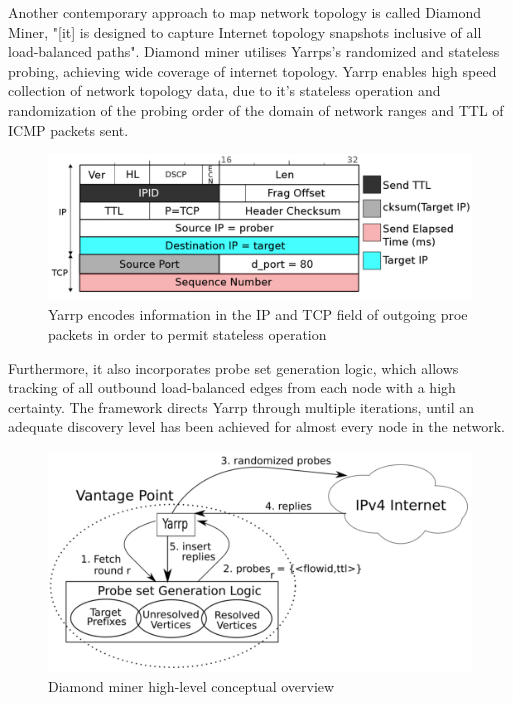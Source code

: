 Another contemporary approach to map network topology is called Diamond Miner, "[it] is designed to capture Internet topology snapshots inclusive of all load-balanced paths". \cite{diamond-miner} Diamond miner utilises Yarrps's randomized and stateless probing, achieving wide coverage of internet topology. Yarrp enables high speed collection of network topology data, due to it's stateless operation and randomization of the probing order of the domain of network ranges and TTL of ICMP packets sent. \cite{yarrp}

\begin{figure}[!ht]
  \begin{center}
    \includegraphics[scale=0.3]{images/yarrp.png}
    \caption{Yarrp encodes information in the IP and TCP field of outgoing proe packets in order to permit stateless operation \cite{yarrp}}
    \label{figure:yarrp_fig}
  \end{center}
\end{figure}

Furthermore, it also incorporates probe set generation logic, which allows tracking of all outbound load-balanced edges from each node with a high certainty. The framework directs Yarrp through multiple iterations, until an adequate discovery level has been achieved for almost every node in the network. \cite{diamond-miner}

\begin{figure}[!ht]
  \begin{center}
    \includegraphics[scale=0.3]{images/diamond.png}
    \caption{Diamond miner high-level conceptual overview \cite{diamond-miner}}
    \label{figure:dminer_overview_fig}
  \end{center}
\end{figure}

